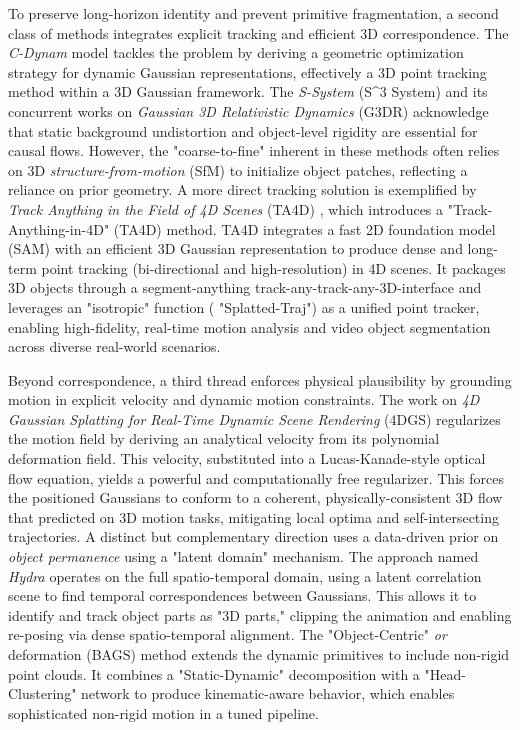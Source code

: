 \documentclass[11pt,a4paper]{article}
\begin{document}
To preserve long-horizon identity and prevent primitive fragmentation, a second class of methods integrates explicit tracking and efficient 3D correspondence. The \emph{C-Dynam} model \cite{arxiv:2605.04844v1} tackles the problem by deriving a geometric optimization strategy for dynamic Gaussian representations, effectively a 3D point tracking method within a 3D Gaussian framework. The \emph{S-System} (S\textasciicircum{}3 System) \cite{arxiv:2403.15624v1} and its concurrent works on \emph{Gaussian 3D Relativistic Dynamics} (G3DR) \cite{arxiv:2402.07181v1} acknowledge that static background undistortion and object-level rigidity are essential for causal flows. However, the "coarse-to-fine" inherent in these methods often relies on 3D \emph{structure-from-motion} (SfM) to initialize object patches, reflecting a reliance on prior geometry. A more direct tracking solution is exemplified by \emph{Track Anything in the Field of 4D Scenes} (TA4D) \cite{arxiv:2312.00732v1}, which introduces a "Track-Anything-in-4D" (TA4D) method. TA4D integrates a fast 2D foundation model (SAM) with an efficient 3D Gaussian representation to produce dense and long-term point tracking (bi-directional and high-resolution) in 4D scenes. It packages 3D objects through a segment-anything track-any-track-any-3D-interface and leverages an "isotropic" function ( "Splatted-Traj") as a unified point tracker, enabling high-fidelity, real-time motion analysis and video object segmentation across diverse real-world scenarios.

Beyond correspondence, a third thread enforces physical plausibility by grounding motion in explicit velocity and dynamic motion constraints. The work on \emph{4D Gaussian Splatting for Real-Time Dynamic Scene Rendering} (4DGS) regularizes the motion field by deriving an analytical velocity from its polynomial deformation field. This velocity, substituted into a Lucas-Kanade-style optical flow equation, yields a powerful and computationally free regularizer. This forces the positioned Gaussians to conform to a coherent, physically-consistent 3D flow that predicted on 3D motion tasks, mitigating local optima and self-intersecting trajectories. A distinct but complementary direction uses a data-driven prior on \emph{object permanence} using a "latent domain" mechanism. The approach named \emph{ Hydra} \cite{arxiv:2505.02175v1} operates on the full spatio-temporal domain, using a latent correlation scene to find temporal correspondences between Gaussians. This allows it to identify and track object parts as "3D parts," clipping the animation and enabling re-posing via dense spatio-temporal alignment. The "Object-Centric" \emph{or} deformation (BAGS) method \cite{arxiv:2507.19830v2} extends the dynamic primitives to include non-rigid point clouds. It combines a "Static-Dynamic" decomposition with a "Head-Clustering" network to produce kinematic-aware behavior, which enables sophisticated non-rigid motion in a tuned pipeline.
\end{document}
